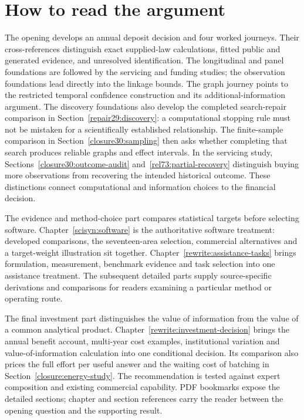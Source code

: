 \chapter*{How to read the argument}

The opening develops an annual deposit decision and four worked journeys.
Their cross-references distinguish exact supplied-law calculations, fitted
public and generated evidence, and unresolved identification. The longitudinal
and panel foundations are followed by the servicing and funding studies;
the observation foundations lead directly into the linkage bounds. The graph
journey points to the restricted temporal confidence construction and its
additional-information argument. The discovery foundations also develop the
completed search-repair comparison in Section~\ref{repair29:discovery}: a
computational stopping rule must not be mistaken for a scientifically
established relationship. The finite-sample comparison in
Section~\ref{closure30:sampling} then asks whether completing that search
produces reliable graphs and effect intervals. In the servicing study,
Sections~\ref{closure30:outcome-audit} and~\ref{rel73:partial-recovery}
distinguish buying more observations from recovering the intended historical
outcome. These distinctions connect computational and information choices
to the financial decision.

The evidence and method-choice part compares statistical targets before
selecting software. Chapter~\ref{scisyn:software} is the authoritative
software treatment: developed comparisons, the seventeen-area selection,
commercial alternatives and a target-weight illustration sit together.
Chapter~\ref{rewrite:assistance-tasks} brings formulation, measurement,
benchmark evidence and task selection into one assistance treatment.
The subsequent detailed parts supply source-specific derivations and
comparisons for readers examining a particular method or operating route.

The final investment part distinguishes the value of information from the
value of a common analytical product. Chapter~\ref{rewrite:investment-decision}
brings the annual benefit account, multi-year cost examples, institutional
variation and value-of-information calculation into one conditional decision.
Its comparison also prices the full effort per useful answer and the
waiting cost of batching in Section~\ref{closure:energy-study}. The
recommendation is tested against expert composition and existing
commercial capability. PDF bookmarks expose the detailed sections; chapter
and section references carry the reader between the opening question and
the supporting result.


